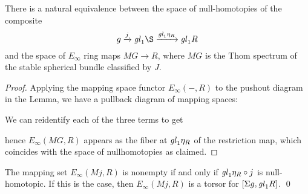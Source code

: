 \begin{corollary}
There is a natural equivalence between the space of null-homotopies of the composite \[g \xrightarrow j \gl_1 \S \xrightarrow{\gl_1 \eta_R} \gl_1 R\] and the space of $E_\infty$ ring maps $MG \to R$, where $MG$ is the Thom spectrum of the stable spherical bundle classified by $J$.
\end{corollary}
\begin{proof}
Applying the mapping space functor $E_\infty(-, R)$ to the pushout diagram in the Lemma, we have a pullback diagram of mapping spaces:
\begin{center}
\end{center}
We can reidentify each of the three terms to get
\begin{center}
\end{center}
hence $E_\infty(MG, R)$ appears as the fiber at $\mathit{gl}_1 \eta_R$ of the restriction map, which coincides with the space of nullhomotopies as claimed.
\end{proof}

\begin{corollary}
The mapping set $E_\infty(Mj, R)$ is nonempty if and only if $\mathit{gl}_1 \eta_R \circ j$ is null-homotopic.  If this is the case, then $E_\infty(Mj, R)$ is a torsor for $[\Sigma g, \mathit{gl}_1 R]$. \qed
\end{corollary}

